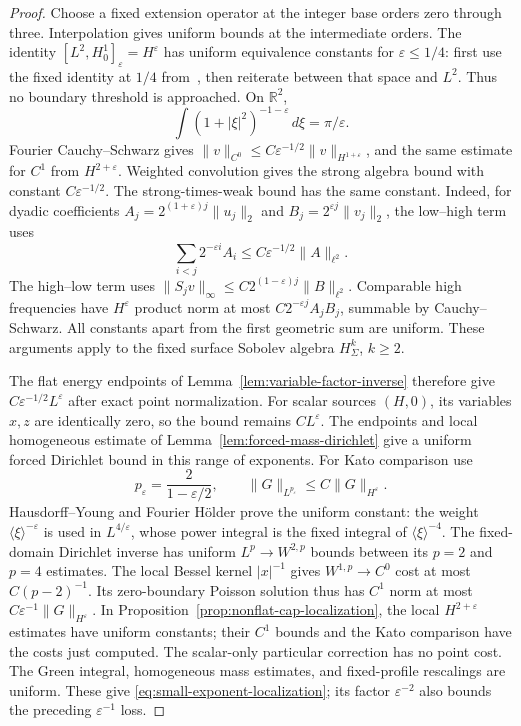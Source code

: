\documentclass[11pt]{amsart}
\theoremstyle{definition}
\theoremstyle{remark}
\theoremstyle{plain}
\begin{document}
\begin{proof}
Choose a fixed extension operator at the integer base orders
zero through three. Interpolation gives uniform bounds at the
intermediate orders. The identity
$[L^2,H^1_0]_\varepsilon=H^\varepsilon$ has uniform equivalence
constants for $\varepsilon\leq1/4$: first use the fixed
identity at $1/4$ from~\cite[Definition 2.1 and Theorem 2.2]{Grubb16},
then reiterate between that space and $L^2$. Thus no boundary
threshold is approached. On $\mathbb R^2$,
\[
 \int(1+|\xi|^2)^{-1-\varepsilon}\,d\xi=\pi/\varepsilon.
\]
Fourier Cauchy--Schwarz gives
$\|v\|_{C^0}\leq C\varepsilon^{-1/2}\|v\|_{H^{1+\varepsilon}}$,
and the same estimate for $C^1$ from $H^{2+\varepsilon}$.
Weighted convolution gives the strong algebra bound with
constant $C\varepsilon^{-1/2}$. The strong-times-weak bound
has the same constant. Indeed, for dyadic coefficients
$A_j=2^{(1+\varepsilon)j}\|u_j\|_2$ and
$B_j=2^{\varepsilon j}\|v_j\|_2$, the low--high term uses
\[
 \sum_{i<j}2^{-\varepsilon i}A_i
                 \leq C\varepsilon^{-1/2}\|A\|_{\ell^2}.
\]
The high--low term uses
$\|S_jv\|_\infty\leq C2^{(1-\varepsilon)j}\|B\|_{\ell^2}$.
Comparable high frequencies have $H^\varepsilon$ product
norm at most $C2^{-\varepsilon j}A_jB_j$, summable by
Cauchy--Schwarz. All constants apart from the first geometric
sum are uniform. These arguments apply to the fixed surface
Sobolev algebra $H^k_\Sigma$, $k\geq2$.

The flat energy endpoints of
Lemma~\ref{lem:variable-factor-inverse} therefore give
$C\varepsilon^{-1/2}L^\varepsilon$ after exact point
normalization. For scalar sources $(H,0)$, its variables
$x,z$ are identically zero, so the bound remains
$CL^\varepsilon$. The endpoints and local homogeneous
estimate of Lemma~\ref{lem:forced-mass-dirichlet} give a
uniform forced Dirichlet bound in this range of exponents.
For Kato comparison use
\[
 p_\varepsilon=\frac{2}{1-\varepsilon/2},\qquad
                   \|G\|_{L^{p_\varepsilon}}\leq C\|G\|_{H^\varepsilon}.
\]
Hausdorff--Young and Fourier H\"older prove the uniform
constant: the weight $\langle\xi\rangle^{-\varepsilon}$
is used in $L^{4/\varepsilon}$, whose power integral is the
fixed integral of $\langle\xi\rangle^{-4}$. The fixed-domain
Dirichlet inverse has uniform $L^p\to W^{2,p}$ bounds between
its $p=2$ and $p=4$ estimates. The local Bessel kernel
$|x|^{-1}$ gives $W^{1,p}\to C^0$ cost at most $C(p-2)^{-1}$.
Its zero-boundary Poisson solution thus has $C^1$ norm at most
$C\varepsilon^{-1}\|G\|_{H^\varepsilon}$.
In Proposition~\ref{prop:nonflat-cap-localization}, the local
$H^{2+\varepsilon}$ estimates have uniform constants; their
$C^1$ bounds and the Kato comparison have the costs just
computed. The scalar-only particular correction has no point
cost. The Green integral, homogeneous mass estimates, and
fixed-profile rescalings are uniform. These give
\eqref{eq:small-exponent-localization}; its factor
$\varepsilon^{-2}$ also bounds the preceding
$\varepsilon^{-1}$ loss.


\end{proof}
\end{document}
